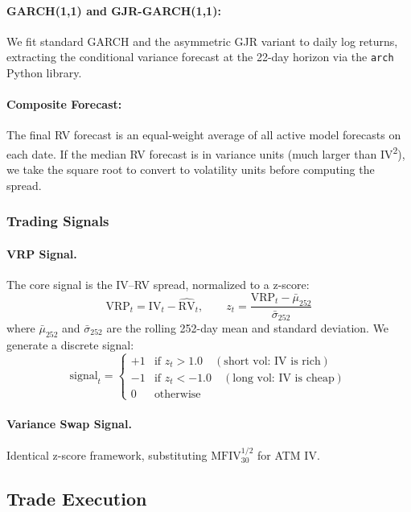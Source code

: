 \documentclass[11pt,a4paper]{article}
\begin{document}
\paragraph{GARCH(1,1) and GJR-GARCH(1,1):}
We fit standard GARCH and the asymmetric GJR variant to daily log returns, extracting the conditional variance forecast at the 22-day horizon via the \texttt{arch} Python library.

\paragraph{Composite Forecast:}
The final RV forecast is an equal-weight average of all active model forecasts on each date.
If the median RV forecast is in variance units (much larger than IV\textsuperscript{2}), we take the square root to convert to volatility units before computing the spread.

\subsubsection{Trading Signals}

\paragraph{VRP Signal.}
The core signal is the IV--RV spread, normalized to a z-score:
\begin{equation}
    \text{VRP}_t = \text{IV}_t - \widehat{\text{RV}}_t, \qquad z_t = \frac{\text{VRP}_t - \bar{\mu}_{252}}{\bar{\sigma}_{252}}
\end{equation}
where $\bar{\mu}_{252}$ and $\bar{\sigma}_{252}$ are the rolling 252-day mean and standard deviation.
We generate a discrete signal:
\[
    \text{signal}_t = \begin{cases}
        +1 & \text{if } z_t > 1.0 \quad (\text{short vol: IV is rich}) \\
        -1 & \text{if } z_t < -1.0 \quad (\text{long vol: IV is cheap}) \\
        0  & \text{otherwise}
    \end{cases}
\]

\paragraph{Variance Swap Signal.}
Identical z-score framework, substituting $\text{MFIV}_{30}^{1/2}$ for ATM IV.

\subsection{Trade Execution}
\end{document}
